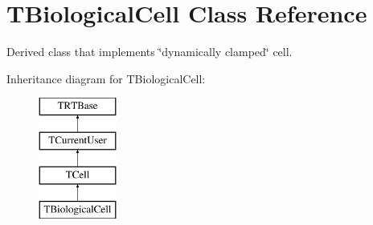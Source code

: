 \hypertarget{class_t_biological_cell}{\section{T\+Biological\+Cell Class Reference}
\label{class_t_biological_cell}
}


Derived class that implements \char`\"{}dynamically clamped\char`\"{} cell.  


Inheritance diagram for T\+Biological\+Cell\+:\begin{figure}[H]
\begin{center}
\leavevmode
\includegraphics[height=4.000000cm]{class_t_biological_cell}
\end{center}
\end{figure}
